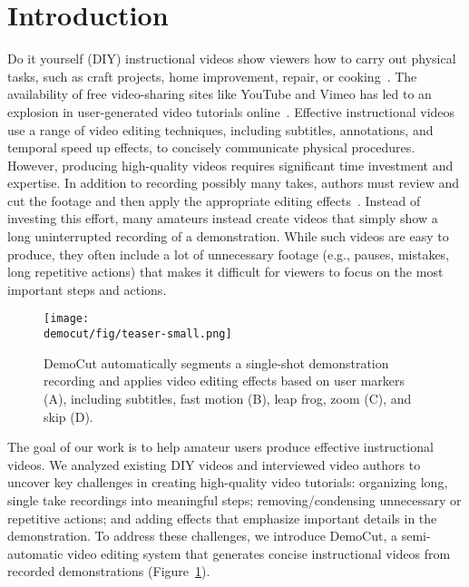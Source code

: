 
\section{Introduction}

Do it yourself (DIY) instructional videos show viewers how to carry
out physical tasks, such as craft projects, home improvement, repair,
or cooking~\cite{Torrey:2007he}. The availability of free
video-sharing sites like YouTube and Vimeo has led to an explosion in
user-generated video tutorials
online~\cite{Lafreniere:2012tl}. Effective instructional videos use a
range of video editing techniques, including subtitles, annotations, and
temporal speed up effects, to concisely communicate physical
procedures. However, producing high-quality videos requires
significant time investment and expertise. In addition to recording
possibly many takes, authors must review and cut the footage and then
apply the appropriate editing effects~\cite{Muller:2009tw}.
Instead of investing this effort, many amateurs instead create videos that simply show a long
uninterrupted recording of a demonstration.
%
While such videos are easy to produce, they often include a
lot of unnecessary footage (e.g., pauses, mistakes, long repetitive
actions) that makes it difficult for viewers to focus on the most
important steps and actions.
%

\begin{figure}[t]
  \centering
	\texttt{[image: \\democut/fig/teaser-small.png]}
  \caption{DemoCut automatically segments a single-shot demonstration recording and applies video editing effects based on user markers (A), including subtitles, fast motion (B), leap frog, zoom (C), and skip (D).}
  \label{fig:teaser}
  \vspace{-0.25in}
\end{figure}

The goal of our work is to help amateur users produce effective instructional videos.
%
We analyzed existing DIY videos and interviewed video authors to uncover key challenges in creating high-quality
video tutorials: organizing long, single take recordings into
meaningful steps; removing/condensing unnecessary or repetitive
actions; and adding effects that emphasize important details in the
demonstration.
%
To address these challenges, we introduce DemoCut, a semi-automatic
video editing system that generates concise instructional videos from
recorded demonstrations (Figure~\ref{fig:teaser}).

